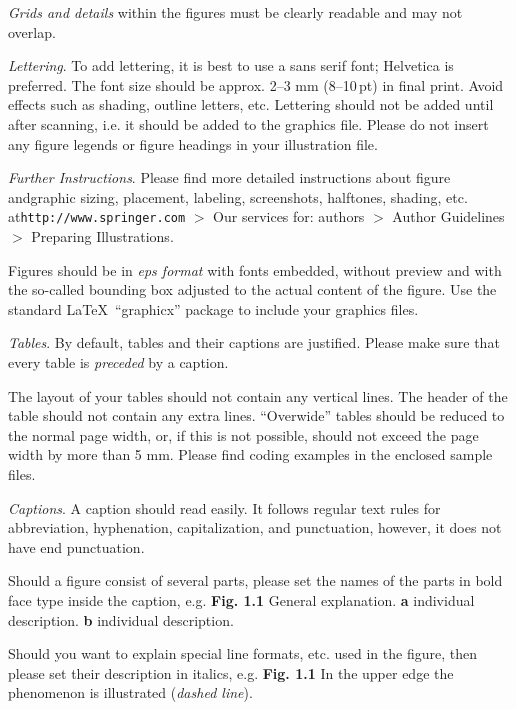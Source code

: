 \documentclass[graybox]{svmono}
\begin{document}
\emph{Grids and details} within the figures must be clearly readable and may not overlap.

\enlargethispage{12pt}

\emph{Lettering}. To add lettering, it is best to use a sans serif font; Helvetica is preferred. The font size should be approx. 2--3 mm (8--10\,pt) in final print. Avoid effects such as shading, outline letters, etc. Lettering should not be added until after scanning, i.e. it should be added to the graphics file. Please do not insert any figure legends or figure headings in your illustration file.

\emph{Further Instructions}. Please find more detailed instructions about figure and\break graphic sizing, placement, labeling, screenshots, halftones, shading, etc. at\break \texttt{http://www.springer.com} $>$ Our services for: authors $>$ Author Guidelines $>$ Preparing Illustrations.

Figures should be in \emph{eps format} with fonts embedded, without preview and with the so-called bounding box adjusted to the actual content of the figure. Use the standard \LaTeX~``graphicx'' package to include your graphics files.

\emph{Tables}. By default, tables and their captions are justified. Please make sure that every table is \emph{preceded} by a caption.

The layout of your tables should not contain any vertical lines. The header of the table should not contain any extra lines. ``Overwide'' tables should be reduced to the normal page width, or, if this is not possible, should not exceed the page width by more than 5 mm. Please find coding examples in the enclosed sample files.

\emph{Captions}. A caption should read easily. It follows regular text rules for abbreviation, hyphenation, capitalization, and punctuation, however, it does not have end punctuation.

Should a figure consist of several parts, please set the names of the parts in bold face type inside the caption, e.g. \textbf{Fig. 1.1} General explanation. \textbf{a} individual description. \textbf{b} individual description.

Should you want to explain special line formats, etc. used in the figure, then please set their description in italics, e.g. \textbf{Fig. 1.1} In the upper edge the phenomenon is illustrated (\textit{dashed line}).


\enlargethispage{12pt}
\end{document}
